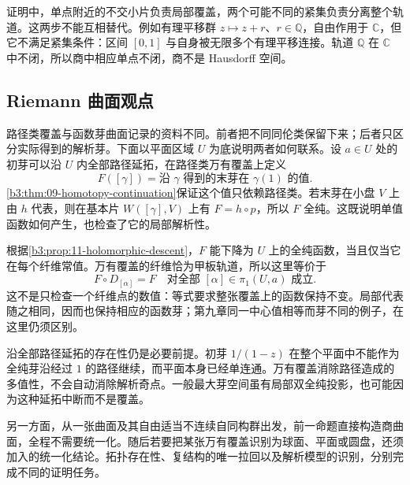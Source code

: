 证明中，单点附近的不交小片负责局部覆盖，两个可能不同的紧集负责分离整个轨道。这两步不能互相替代。例如有理平移群 \(z\mapsto z+r\)、\(r\in\mathbb Q\)，自由作用于 \(\mathbb C\)，但它不满足紧集条件：区间 \([0,1]\) 与自身被无限多个有理平移连接。轨道 \(\mathbb Q\) 在 \(\mathbb C\) 中不闭，所以商中相应单点不闭，商不是 Hausdorff 空间。

\subsection{Riemann 曲面观点}
\label{b3:subsec:110304}

路径类覆盖与函数芽曲面记录的资料不同。前者把不同同伦类保留下来；后者只区分实际得到的解析芽。下面以平面区域 \(U\) 为底说明两者如何联系。设 \(a\in U\) 处的初芽可以沿 \(U\) 内全部路径延拓，在路径类万有覆盖上定义
\[
 F([\gamma])=\text{沿 }\gamma\text{ 得到的末芽在 }\gamma(1)\text{ 的值}.
\]
\cref{b3:thm:09-homotopy-continuation}保证这个值只依赖路径类。若末芽在小盘 \(V\) 上由 \(h\) 代表，则在基本片 \(W([\gamma],V)\) 上有 \(F=h\circ p\)，所以 \(F\) 全纯。这既说明单值函数如何产生，也检查了它的局部解析性。

\ProseParagraphBreak
根据\cref{b3:prop:11-holomorphic-descent}，\(F\) 能下降为 \(U\) 上的全纯函数，当且仅当它在每个纤维常值。万有覆盖的纤维恰为甲板轨道，所以这里等价于
\[
 F\circ D_{[\alpha]}=F\quad
 \text{对全部 }[\alpha]\in\pi_1(U,a)\text{ 成立}.
\]
这不是只检查一个纤维点的数值：等式要求整张覆盖上的函数保持不变。局部代表随之相同，因而也保持相应的函数芽；第九章同一中心值相等而芽不同的例子，在这里仍须区别。

\ProseParagraphBreak
沿全部路径延拓的存在性仍是必要前提。初芽 \(1/(1-z)\) 在整个平面中不能作为全纯芽沿经过 \(1\) 的路径继续，而平面本身已经单连通。万有覆盖消除路径造成的多值性，不会自动消除解析奇点。一般最大芽空间虽有局部双全纯投影，也可能因为这种延拓中断而不是覆盖。

\ProseParagraphBreak
另一方面，从一张曲面及其自由适当不连续自同构群出发，前一命题直接构造商曲面，全程不需要统一化。随后若要把某张万有覆盖识别为球面、平面或圆盘，还须加入的统一化结论。拓扑存在性、复结构的唯一拉回以及解析模型的识别，分别完成不同的证明任务。
